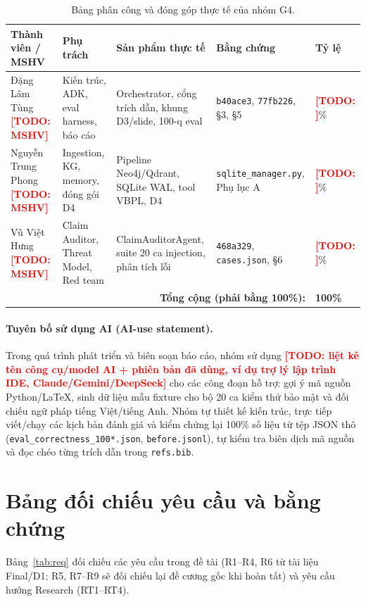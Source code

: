 \documentclass[sigconf,nonacm]{acmart}
\newcommand{\TODO}[1]{\textcolor{red}{\textbf{[TODO: #1]}}}
\begin{document}
\begin{table}[H]
\caption{Bảng phân công và đóng góp thực tế của nhóm G4.}
\label{tab:contrib}
\scriptsize
\begin{tabular}{@{}p{1.8cm}p{1.6cm}p{1.8cm}p{1.6cm}p{0.6cm}@{}}
\toprule
\textbf{Thành viên / MSHV} & \textbf{Phụ trách} & \textbf{Sản phẩm thực tế} & \textbf{Bằng chứng} & \textbf{Tỷ lệ} \\
\midrule
Đặng Lâm Tùng \TODO{MSHV} & Kiến trúc, ADK, eval harness, báo cáo & Orchestrator, cổng trích dẫn, khung D3/slide, 100-q eval & \texttt{b40ace3}, \texttt{77fb226}, §3, §5 & \TODO{}\% \\
Nguyễn Trung Phong \TODO{MSHV} & Ingestion, KG, memory, đóng gói D4 & Pipeline Neo4j/Qdrant, SQLite WAL, tool VBPL, D4 & \texttt{sqlite\_manager.py}, Phụ lục A & \TODO{}\% \\
Vũ Việt Hưng \TODO{MSHV} & Claim Auditor, Threat Model, Red team & ClaimAuditorAgent, suite 20 ca injection, phân tích lỗi & \texttt{468a329}, \texttt{cases.json}, §6 & \TODO{}\% \\
\midrule
\multicolumn{4}{r}{\textbf{Tổng cộng (phải bằng 100\%):}} & \textbf{100\%} \\
\bottomrule
\end{tabular}
\end{table}

\paragraph{Tuyên bố sử dụng AI (AI-use statement).}
Trong quá trình phát triển và biên soạn báo cáo, nhóm sử dụng \TODO{liệt kê tên công cụ/model AI + phiên bản đã dùng, ví dụ trợ lý lập trình IDE, Claude/Gemini/DeepSeek} cho các công đoạn hỗ trợ: gợi ý mã nguồn Python/LaTeX, sinh dữ liệu mẫu fixture cho bộ 20 ca kiểm thử bảo mật và đối chiếu ngữ pháp tiếng Việt/tiếng Anh. Nhóm tự thiết kế kiến trúc, trực tiếp viết/chạy các kịch bản đánh giá và kiểm chứng lại 100\% số liệu từ tệp JSON thô (\texttt{eval\_correctness\_100*.json}, \texttt{before.jsonl}), tự kiểm tra biên dịch mã nguồn và đọc chéo từng trích dẫn trong \texttt{refs.bib}.

\section{Bảng đối chiếu yêu cầu và bằng chứng}
\label{app:matrix}

Bảng~\ref{tab:req} đối chiếu các yêu cầu trong đề tài (R1--R4, R6 từ tài liệu Final/D1; R5, R7--R9 sẽ đối chiếu lại đề cương gốc khi hoàn tất) và yêu cầu hướng Research (RT1--RT4).
\end{document}
